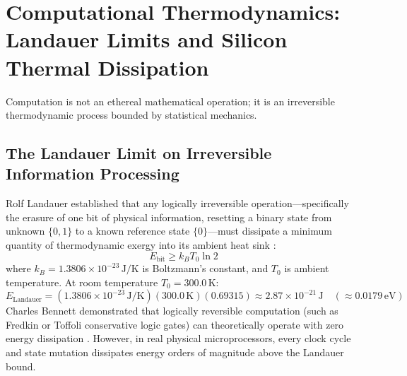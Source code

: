 \section{Computational Thermodynamics: Landauer Limits and Silicon Thermal Dissipation}
\label{sec:th_computation}

Computation is not an ethereal mathematical operation; it is an irreversible thermodynamic process bounded by statistical mechanics.

\subsection{The Landauer Limit on Irreversible Information Processing}
Rolf Landauer established that any logically irreversible operation---specifically the erasure of one bit of physical information, resetting a binary state from unknown $\{0, 1\}$ to a known reference state $\{0\}$---must dissipate a minimum quantity of thermodynamic exergy into its ambient heat sink \cite{landauer1961irreversibility}:
\begin{equation}
E_{\mathrm{bit}} \ge k_B T_0 \ln 2
\label{eq:landauer_limit}
\end{equation}
where $k_B = 1.3806 \times 10^{-23}\,\mathrm{J/K}$ is Boltzmann's constant, and $T_0$ is ambient temperature. At room temperature $T_0 = 300.0\,\mathrm{K}$:
\begin{equation}
E_{\mathrm{Landauer}} = (1.3806 \times 10^{-23}\,\mathrm{J/K})(300.0\,\mathrm{K})(0.69315) \approx 2.87 \times 10^{-21}\,\mathrm{J} \quad (\approx 0.0179\,\mathrm{eV})
\label{eq:landauer_val_300k}
\end{equation}
Charles Bennett demonstrated that logically reversible computation (such as Fredkin or Toffoli conservative logic gates) can theoretically operate with zero energy dissipation \cite{bennett1982thermodynamics}. However, in real physical microprocessors, every clock cycle and state mutation dissipates energy orders of magnitude above the Landauer bound.

